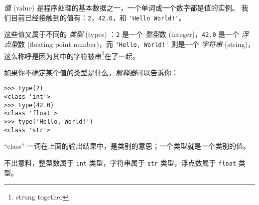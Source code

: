 
{\em 值} (value) 是程序处理的基本数据之一，一个单词或一个数字都是值的实例。 我们目前已经接触到的值有：\lstinline{2}，\lstinline{42.0}，和 \lstinline{'Hello World!'}。


这些值又属于不同的 {\em 类型} (types) ：\lstinline{2} 是一个 {\em 整型}数 (integer)，\lstinline{42.0} 是一个 {\em 浮点型}数 (floating point number)，而 \lstinline{'Hello, World!'}  则是一个  {\em 字符串} (string)，这么称呼是因为其中的字符被串\footnote{strung together}在了一起。
  
  


如果你不确定某个值的类型是什么，{\em 解释器}可以告诉你：

\begin{lstlisting}
>>> type(2)
<class 'int'>
>>> type(42.0)
<class 'float'>
>>> type('Hello, World!')
<class 'str'>
\end{lstlisting}

%

``class'' 一词在上面的输出结果中，是类别的意思；一个类型就是一个类别的值。
  


不出意料，整型数属于 \lstinline{int} 类型，字符串属于 \lstinline{str} 类型，浮点数属于 \lstinline{float} 类型。
    
    

    
    


